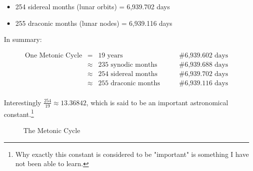 \documentclass[11pt, oneside]{article}   	%
\theoremstyle{definition}
\begin{document}
\begin{itemize}
\item 254 sidereal months (lunar orbits) = 6,939.702 days
\item 255 draconic months (lunar nodes) = 6,939.116 days
\end{itemize}

\noindent
In summary: 

\begin{equation*}
\begin{array}{lllll}
\text{One Metonic Cycle}
&=& \text{19 years}                                  &\qquad  \mathrel{\#} \text {6,939.602 days}    \\
&\approx& \text {235 synodic months}    &\qquad  \mathrel{\#} \text{6,939.688 days}      \\
&\approx& \text {254 sidereal months}    &\qquad  \mathrel{\#} \text {6,939.702 days}     \\
&\approx& \text {255 draconic months}   &\qquad  \mathrel{\#} \text {6,939.116 days}     \\
\end{array}
\end{equation*}




\bigskip
\noindent
Interestingly $\frac{254}{19} \approx 13.36842$,  which is said to be an important astronomical constant.\footnote{Why exactly this constant is considered to be "important" is something 
I have not been able to learn.}

\bigskip
\bigskip
\begin{figure}[H]
\caption{The Metonic Cycle \cite{youtube:freeth2021}}
\label{fig:metonic_cycle}
\end{figure}
\end{document}
